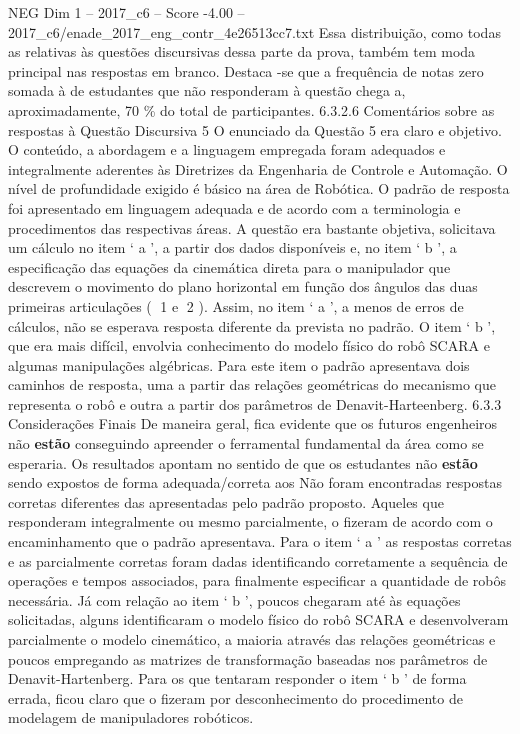 \begin{textsample}{NEG Dim 1 – 2017\_c6 – Score -4.00 – 2017\_c6/enade\_2017\_eng\_contr\_4e26513cc7.txt}
Essa distribuição, como todas as relativas às questões discursivas dessa parte da prova, também tem moda principal nas respostas em branco.
Destaca -se que a frequência de notas zero somada à de estudantes que não responderam à questão chega a, aproximadamente, 70 \% do total de participantes. 6.3.2.6 Comentários sobre as respostas à Questão Discursiva 5 O enunciado da Questão 5 era claro e objetivo.
O conteúdo, a abordagem e a linguagem empregada foram adequados e integralmente aderentes às Diretrizes da Engenharia de Controle e Automação.
O nível de profundidade exigido é básico na área de Robótica.
O padrão de resposta foi apresentado em linguagem adequada e de acordo com a terminologia e procedimentos das respectivas áreas.
A questão era bastante objetiva, solicitava um cálculo no item ‘ a ’, a partir dos dados disponíveis e, no item ‘ b ’, a especificação das equações da cinemática direta para o manipulador que descrevem o movimento do plano horizontal em função dos ângulos das duas primeiras articulações ( 1 e 2 ).
Assim, no item ‘ a ’, a menos de erros de cálculos, não se esperava resposta diferente da prevista no padrão.
O item ‘ b ’, que era mais difícil, envolvia conhecimento do modelo físico do robô SCARA e algumas manipulações algébricas.
Para este item o padrão apresentava dois caminhos de resposta, uma a partir das relações geométricas do mecanismo que representa o robô e outra a partir dos parâmetros de Denavit-Harteenberg. 6.3.3 Considerações Finais De maneira geral, fica evidente que os futuros engenheiros não \textbf{estão} conseguindo apreender o ferramental fundamental da área como se esperaria.
Os resultados apontam no sentido de que os estudantes não \textbf{estão} sendo expostos de forma adequada/correta aos Não foram encontradas respostas corretas diferentes das apresentadas pelo padrão proposto.
Aqueles que responderam integralmente ou mesmo parcialmente, o fizeram de acordo com o encaminhamento que o padrão apresentava.
Para o item ‘ a ’ as respostas corretas e as parcialmente corretas foram dadas identificando corretamente a sequência de operações e tempos associados, para finalmente especificar a quantidade de robôs necessária.
Já com relação ao item ‘ b ’, poucos chegaram até às equações solicitadas, alguns identificaram o modelo físico do robô SCARA e desenvolveram parcialmente o modelo cinemático, a maioria através das relações geométricas e poucos empregando as matrizes de transformação baseadas nos parâmetros de Denavit-Hartenberg.
Para os que tentaram responder o item ‘ b ’ de forma errada, ficou claro que o fizeram por desconhecimento do procedimento de modelagem de manipuladores robóticos.

\end{textsample}
